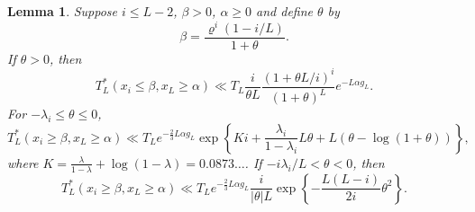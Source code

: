 \documentclass[11pt]{amsart}
\theoremstyle{remark}
\theoremstyle{plain}
\newtheorem{lem}{Lemma}[section]
\numberwithin{equation}{section}
\newcommand{\be}{\begin{equation}}
\newcommand{\ee}{\end{equation}}
\newcommand{\lam}{\ensuremath{\lambda}}
\renewcommand{\a}{\ensuremath{\alpha}}
\renewcommand{\b}{\ensuremath{\beta}}
\renewcommand{\(}{\left(}
\renewcommand{\)}{\right)}
\renewcommand{\le}{\leqslant}
\renewcommand{\ge}{\geqslant}
\renewcommand{\rho}{\varrho}
\renewcommand{\th}{\ensuremath{\theta}}
\begin{document}
\begin{lem} \label{xi lem}  Suppose $i\le L-2$, $\b>0$, $\a \ge 0$ and define $\theta$ by
\be\label{beta def}
\b = \frac{\rho^i(1-i/L)}{1+\theta}.
\ee
If $\theta>0$, then
\be\label{xi small}
T_L^*(x_i\le\b,x_L\ge \a) \ll T_L \frac{i}{\theta L} \frac{(1+\theta L/i)^i}
{(1+\theta)^L} e^{-L\a g_L}.
\ee
For $-\lam_i \le \th \le 0$,
\be\label{xi big1}
T_L^*(x_i\ge\b,x_L\ge \a) 
\ll T_L  e^{-\frac23 L \a g_L} \exp\left\{ Ki+\frac{\lam_i}{1-\lam_i} L\theta+L(\theta-\log(1+\theta))
\right\},
\ee
where $K=\frac{\lam}{1-\lam}+\log(1-\lam) = 0.0873\ldots$.
If $-i\lambda_i/L<\theta < 0$, then
\be\label{xi big2}
T_L^*(x_i\ge\b,x_L\ge\a) 
\ll  T_L  e^{- \frac23 L\a g_L} \frac{i}{|\theta|L} \exp\left\{
-\frac{L(L-i)}{2i}\th^2 \right\}.
\ee
\end{lem}
\end{document}
